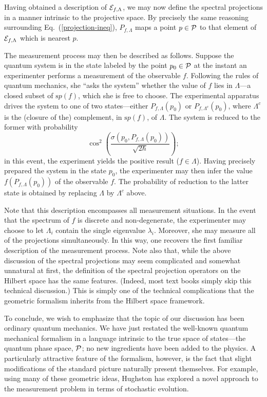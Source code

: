 \documentclass[12pt,aps,eqsecnum,tighten]{revtex4-2}
\def\P{{\cal P}}
\newcommand{\eqn}[1]{Eq.~(\ref{#1})}
\def\Bbb{}
\begin{document}
Having obtained a description of ${\cal E}_{f, \Lambda}$, we may now
define the spectral projections in a manner intrinsic to the
projective space.  By precisely the same reasoning surrounding
\eqn{projection-ineq}, ${\Bbb P}_{f, \Lambda}$ maps a point $p\in\P$
to that element of ${\cal E}_{f, \Lambda}$ which is nearest $p$.

The measurement process may then be described as follows.  Suppose the
quantum system is in the state labeled by the point $p_0\in\P$ at the
instant an experimenter performs a measurement of the observable $f$.
Following the rules of quantum mechanics, she ``asks the system''
whether the value of $f$ lies in $\Lambda$---a closed subset of
${\mathrm sp}(f)$, which she is free to choose.  The experimental
apparatus drives the system to one of two states---either ${\Bbb
P}_{f, \Lambda}(p_0)$ or ${\Bbb P}_{f, \Lambda^c}(p_0)$, where
$\Lambda^c$ is the (closure of the) complement, in ${\mathrm sp}(f)$,
of $\Lambda$.  The system is reduced to the former with probability
%
\[
 \cos^2 \left(
 \frac{\sigma ( p_0, {\Bbb P}_{f, \Lambda}(p_0))}{\sqrt{2\hbar}}
 \right);
\]
%
in this event, the experiment yields the positive result
($f\in\Lambda$).  Having precisely prepared the system in the state
$p_0$, the experimenter may then infer the value $f({\Bbb P}_{f,
\Lambda}(p_0))$ of the observable $f$.  The probability of reduction
to the latter state is obtained by replacing $\Lambda$ by $\Lambda^c$
above.

Note that this description encompasses all measurement situations.  In
the event that the spectrum of $f$ is discrete and non-degenerate, the
experimenter may choose to let $\Lambda_i$ contain the single
eigenvalue $\lambda_i$.  Moreover, she may measure all of the
projections simultaneously.  In this way, one recovers the first
familiar description of the measurement process.  Note also that,
while the above discussion of the spectral projections may seem
complicated and somewhat unnatural at first, the definition of the
spectral projection operators on the Hilbert space has the same
features. (Indeed, most text books simply skip this technical
discussion.) This is simply one of the technical complications that
the geometric formalism inherits from the Hilbert space framework.

To conclude, we wish to emphasize that the topic of our discussion has
been ordinary quantum mechanics.  We have just restated the well-known
quantum mechanical formalism in a language intrinsic to the true space
of states---the quantum phase space, $\P$; no new ingredients have
been added to the physics.  A particularly attractive feature of the
formalism, however, is the fact that slight modifications of the
standard picture naturally present themselves.  For example, using
many of these geometric ideas, Hughston\cite{hughston2} has explored a
novel approach to the measurement problem in terms of stochastic
evolution.
\end{document}
